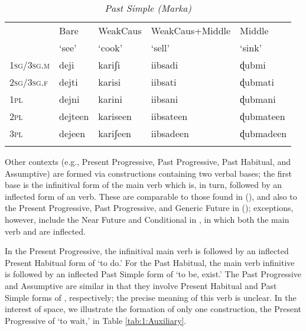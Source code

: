 \documentclass[output=paper]{LSP/langsci}
\begin{document}
 \begin{table}
 	\caption{\textit{Past Simple (Marka)}}
 	\label{tab:1:Past Simple}
 	\begin{tabularx}{\textwidth}{Xllll} 
 		\lsptoprule
 		& Bare   & WeakCaus  & WeakCaus+Middle & Middle   \\
 		& `see' & `cook' & `sell' & `sink' \\ 
 		\midrule
 		1\textsc{sg}/3\textsc{sg.m} & deji & kariʃi & iibsadi & ɖubmi \\
 		2\textsc{sg}/3\textsc{sg.f} & dejti  & karisi & iibsati  & ɖubmati  \\
 		1\textsc{pl} & dejni & karini & iibsani & ɖubmani \\
 		2\textsc{pl} & dejteen & kariseen & iibsateen & ɖubmateen \\
 		3\textsc{pl} & dejeen & kariʃeen & iibsadeen & ɖubmadeen \\
 		\lspbottomrule
 	\end{tabularx}
 \end{table}
 
 Other contexts (e.g., Present Progressive, Past Progressive, Past Habitual, and Assumptive) are formed via  constructions containing two verbal bases; the first base is the infinitival form of the main verb which is, in turn, followed by an inflected form of an  verb. These are comparable to those found in  (\citealt{Greenetal2015}), and also to the Present Progressive, Past Progressive, and Generic Future in  (\citealt{PasterRanero2015}); exceptions, however, include the Near Future and Conditional in , in which both the main verb and  are inflected.
 
 In the  Present Progressive, the infinitival main verb is followed by an inflected Present Habitual form of  `to do.' For the Past Habitual, the main verb infinitive is followed by an inflected Past Simple form of  `to be, exist.' The Past Progressive and Assumptive are similar in that they involve Present Habitual and Past Simple forms of , respectively; the precise meaning of this verb is unclear. In the interest of space, we illustrate the formation of only one  construction, the Present Progressive of  `to wait,' in Table \ref{tab:1:Auxiliary}. 
 
\end{document}
